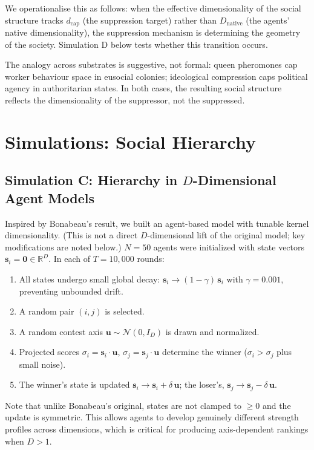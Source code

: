 \documentclass[12pt,a4paper]{article}
\begin{document}
We operationalise this as follows: when the effective dimensionality of the social structure tracks $d_{\mathrm{cap}}$ (the suppression target) rather than $D_{\mathrm{native}}$ (the agents' native dimensionality), the suppression mechanism is determining the geometry of the society.
Simulation D below tests whether this transition occurs.

The analogy across substrates is suggestive, not formal: queen pheromones cap worker behaviour space in eusocial colonies; ideological compression caps political agency in authoritarian states.
In both cases, the resulting social structure reflects the dimensionality of the suppressor, not the suppressed.



\section{Simulations: Social Hierarchy}
\label{sec:sim_social}

\subsection{Simulation C: Hierarchy in $D$-Dimensional Agent Models}

Inspired by Bonabeau's result, we built an agent-based model with tunable kernel dimensionality.
(This is not a direct $D$-dimensional lift of the original model; key modifications are noted below.)
$N = 50$ agents were initialized with state vectors $\mathbf{s}_i = \mathbf{0} \in \mathbb{R}^D$.
In each of $T = 10{,}000$ rounds:
\begin{enumerate}
\item All states undergo small global decay: $\mathbf{s}_i \to (1 - \gamma)\,\mathbf{s}_i$ with $\gamma = 0.001$, preventing unbounded drift.
\item A random pair $(i,j)$ is selected.
\item A random contest axis $\mathbf{u} \sim \mathcal{N}(0, I_D)$ is drawn and normalized.
\item Projected scores $\sigma_i = \mathbf{s}_i \cdot \mathbf{u}$, $\sigma_j = \mathbf{s}_j \cdot \mathbf{u}$ determine the winner ($\sigma_i > \sigma_j$ plus small noise).
\item The winner's state is updated $\mathbf{s}_i \to \mathbf{s}_i + \delta\,\mathbf{u}$; the loser's, $\mathbf{s}_j \to \mathbf{s}_j - \delta\,\mathbf{u}$.
\end{enumerate}
Note that unlike Bonabeau's original, states are not clamped to $\geq 0$ and the update is symmetric.
This allows agents to develop genuinely different strength profiles across dimensions, which is critical for producing axis-dependent rankings when $D > 1$.
\end{document}
